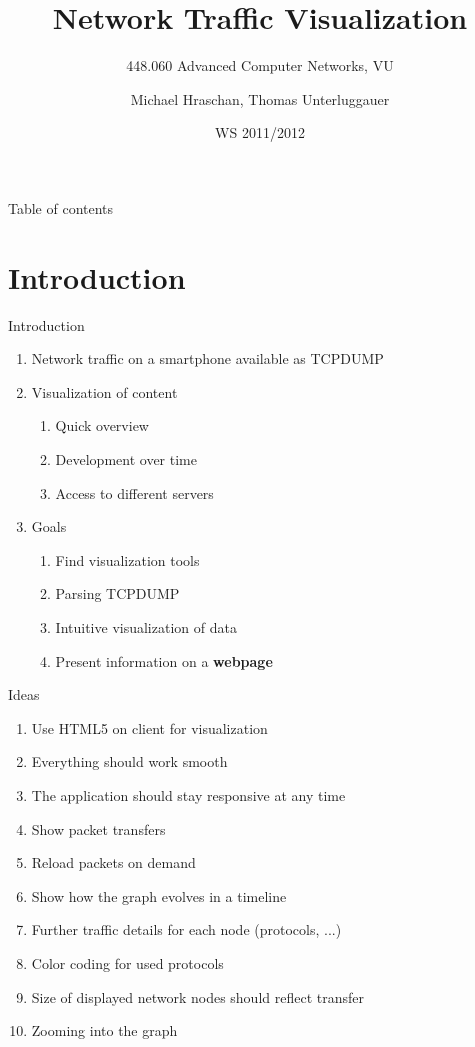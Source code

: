 \documentclass{beamer}
\title
{Network Traffic Visualization}
\subtitle
{448.060 Advanced Computer Networks, VU}
\author
{Michael Hraschan, Thomas Unterluggauer}
\date
{WS 2011/2012}
\begin{document}
\lstset{language=XML,tabsize=2,basicstyle=\footnotesize,breaklines=true}

\begin{frame}
	\titlepage
\end{frame}

\begin{frame}{Table of contents}
	\tableofcontents
\end{frame}

\section{Introduction}
  
\begin{frame}{Introduction}
 \begin{enumerate}
  \item Network traffic on a smartphone available as TCPDUMP
  \item Visualization of content
  \begin{enumerate}
    \item Quick overview
    \item Development over time
    \item Access to different servers
  \end{enumerate}
  \item Goals
  \begin{enumerate}
    \item Find visualization tools
    \item Parsing TCPDUMP
    \item Intuitive visualization of data
    \item Present information on a \textbf{webpage}
  \end{enumerate}
 \end{enumerate}
\end{frame}

\begin{frame}{Ideas}
 \begin{enumerate}
  \item Use HTML5 on client for visualization
  \item Everything should work smooth
  \item The application should stay responsive at any time
  \item Show packet transfers
  \item Reload packets on demand
  \item Show how the graph evolves in a timeline
  \item Further traffic details for each node (protocols, ...)
  \item Color coding for used protocols
  \item Size of displayed network nodes should reflect transfer
  \item Zooming into the graph 
 \end{enumerate}
\end{frame}
\end{document}
